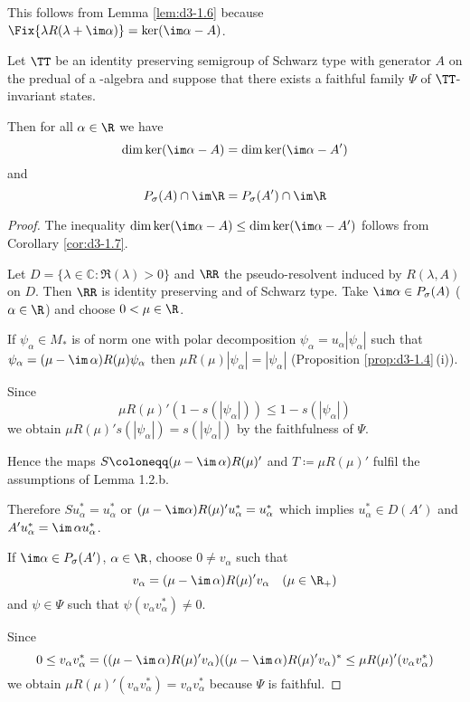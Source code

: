 This follows from Lemma \ref{lem:d3-1.6} because $\Fix{\lambda R(\lambda+\im\alpha)} = \ker(\im\alpha-A)$.
\begin{proposition}\label{prop:d3-1.8}
Let $\TT$ be an identity preserving semigroup of Schwarz type with generator $A$ on the predual of a \WA-algebra and suppose that there exists a faithful family $\Psi$ of $\TT$-invariant states.

Then for all $\alpha \in \R$ we have
\[
\dim \ker(\im\alpha - A) = \dim \ker(\im\alpha - A')
\]
and
\[
P_{\sigma}(A) \cap \im\R = P_{\sigma}(A') \cap \im\R
\]
\end{proposition}

\begin{proof}
The inequality $\dim \ker(\im\alpha - A) \leq \dim \ker(\im\alpha - A')$ follows from Corollary \ref{cor:d3-1.7}.

Let $D = \{\lambda \in \mathbb{C} \colon \Re(\lambda) > 0\}$ and $\RR$ the pseudo-resolvent induced by $R(\lambda,A)$ on $D$.
Then $\RR$ is identity preserving and of Schwarz type.
Take $\im\alpha \in P_{\sigma}(A)$ ($\alpha \in \R$) and choose $0 < \mu \in \R$.

If $\psi_{\alpha} \in M_{*}$ is of norm one with polar decomposition $\psi_{\alpha} = u_{\alpha}|\psi_{\alpha}|$ such that $\psi_{\alpha} = (\mu - \im\,\alpha)R(\mu)\psi_{\alpha}$ then $\mu R(\mu)|\psi_{\alpha}| = |\psi_{\alpha}|$ (Proposition \ref{prop:d3-1.4}\,(i)).

Since
\[
\mu R(\mu)'(1 - s(|\psi_{\alpha}|)) \leq 1 - s(|\psi_{\alpha}|)
\]
we obtain $\mu R(\mu)'s(|\psi_{\alpha}|) = s(|\psi_{\alpha}|)$ by the faithfulness of $\Psi$.

Hence the maps $S \coloneqq (\mu - \im\,\alpha)R(\mu)'$ and $T \coloneqq \mu R(\mu)'$ fulfil the assumptions of Lemma 1.2.b.

Therefore $Su_{\alpha}^{*} = u_{\alpha}^{*}$ or $(\mu-\im\alpha)R(\mu)'u_{\alpha}^{*} = u_{\alpha}^{*}$ which implies $u_{\alpha}^{*} \in D(A')$ and $A'u_{\alpha}^{*} = \im\,\alpha u_{\alpha}^{*}$.

If $\im\alpha \in P_{\sigma}(A')$, $\alpha \in \R$, choose $0 \neq v_{\alpha}$ such that
\[
v_{\alpha} = (\mu - \im\,\alpha)R(\mu)'v_{\alpha} \quad (\mu \in \R_{+})
\]
and $\psi \in \Psi$ such that $\psi(v_{\alpha}v_{\alpha}^{*}) \neq 0$.

Since
\[
0 \leq v_{\alpha}v_{\alpha}^{*} = ((\mu - \im\,\alpha)R(\mu)'v_{\alpha})((\mu - \im\,\alpha)R(\mu)'v_{\alpha})^{*} \leq \mu R(\mu)'(v_{\alpha}v_{\alpha}^{*})
\]
we obtain $\mu R(\mu)'(v_{\alpha}v_{\alpha}^{*}) = v_{\alpha}v_{\alpha}^{*}$ because $\Psi$ is faithful.


\end{proof}
